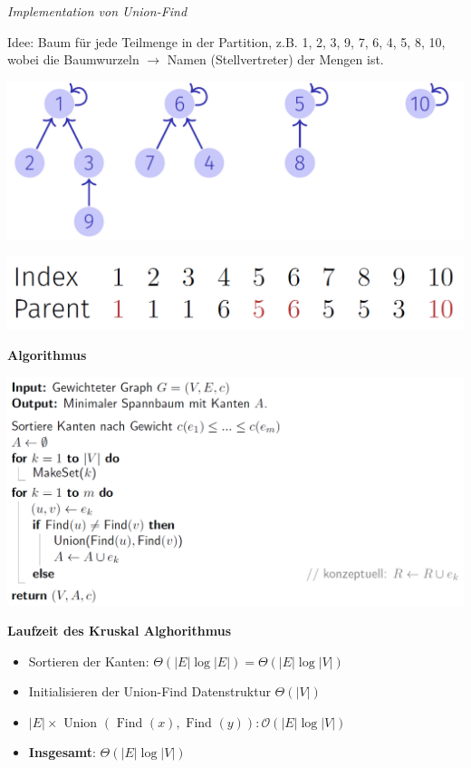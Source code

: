 \begin{sectionbox}
\textit{Implementation von Union-Find}\par
Idee: Baum für jede Teilmenge in der Partition, z.B. {{1, 2, 3, 9}, {7, 6, 4}, {5, 8}, {10}}, wobei die Baumwurzeln $\to$ Namen (Stellvertreter) der Mengen ist.\par\smallskip
\begin{center}
    \includegraphics[width = 0.7\columnwidth]{../img/UF.png}\par\smallskip
    \includegraphics[width = 0.7\columnwidth]{../img/UFarray.png}\par\smallskip
\end{center}
\end{sectionbox}
\vspace{-4pt}
\begin{sectionbox}
\textbf{Algorithmus}\par
\includegraphics[width = \columnwidth]{../img/Kruskal.png}\par\smallskip

\textbf{Laufzeit des Kruskal Alghorithmus}\par
\begin{itemize}
    \item Sortieren der Kanten: $\Theta(|E| \log |E|)=\Theta(|E| \log |V|)$
    \item Initialisieren der Union-Find Datenstruktur $\Theta(|V|)$
    \item $|E| \times \text { Union }(\text { Find }(x), \text { Find }(y)): \mathcal{O}(|E| \log |V|)$
    \item \textbf{Insgesamt}: $\Theta(|E| \log |V|)$
\end{itemize}
\end{sectionbox}
